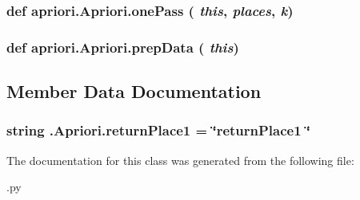 \subsubsection{\setlength{\rightskip}{0pt plus 5cm}def apriori.Apriori.one\-Pass ( {\em this},  {\em places},  {\em k})}\label{classapriori_1_1_apriori_8b247838dfff6d6e88d01200a36af361}


\subsubsection{\setlength{\rightskip}{0pt plus 5cm}def apriori.Apriori.prep\-Data ( {\em this})}\label{classapriori_1_1_apriori_4a4872227cd48f530219cb268039f9ed}




\subsection{Member Data Documentation}
\subsubsection{\setlength{\rightskip}{0pt plus 5cm}string {\bfapriori.Apriori.return\-Place1} = \char`\"{}return\-Place1 \char`\"{}\hspace{0.3cm}{\tt  [static]}}\label{classapriori_1_1_apriori_4547f70a5fd7f65cd370c7b1e922db8b}




The documentation for this class was generated from the following file:\begin{CompactItemize}
\item 
{\bfapriori.py}\end{CompactItemize}
